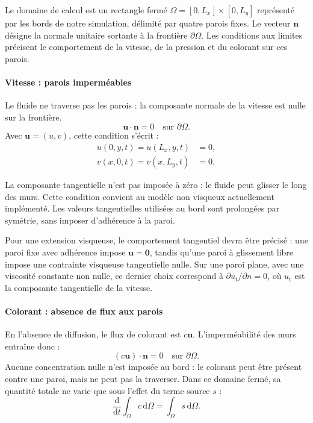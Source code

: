 \label{sec:boundary_conditions}

Le domaine de calcul est un rectangle fermé
$\Omega = [0,L_x] \times [0,L_y]$ représenté par les bords de notre simulation, délimité par quatre parois fixes.
Le vecteur $\mathbf{n}$ désigne la normale unitaire sortante à la frontière
$\partial\Omega$.
Les conditions aux limites précisent le comportement de la vitesse,
de la pression et du colorant sur ces parois.

\paragraph*{Vitesse : parois imperméables}

Le fluide ne traverse pas les parois : la composante normale de la vitesse
est nulle sur la frontière.
\begin{equation}
    \label{eq:wall_impermeability}
    \boxed{\mathbf{u} \cdot \mathbf{n} = 0
        \quad \text{sur } \partial\Omega.}
\end{equation}
Avec $\mathbf{u} = (u,v)$, cette condition s'écrit :
\begin{equation}
    \begin{aligned}
        u(0,y,t) = u(L_x,y,t) &= 0, \\
        v(x,0,t) = v(x,L_y,t) &= 0.
    \end{aligned}
\end{equation}

La composante tangentielle n'est pas imposée à zéro : le fluide peut
glisser le long des murs.
Cette condition convient au modèle non visqueux actuellement implémenté.
Les valeurs tangentielles utilisées au bord sont prolongées par symétrie,
sans imposer d'adhérence à la paroi.

Pour une extension visqueuse, le comportement tangentiel devra être
précisé : une paroi fixe avec adhérence impose $\mathbf{u}=\mathbf{0}$,
tandis qu'une paroi à glissement libre impose une contrainte visqueuse
tangentielle nulle.
Sur une paroi plane, avec une viscosité constante non nulle, ce dernier
choix correspond à $\partial u_{\mathrm{t}}/\partial n = 0$,
où $u_{\mathrm{t}}$ est la composante tangentielle de la vitesse.

\paragraph*{Colorant : absence de flux aux parois}

En l'absence de diffusion, le flux de colorant est $c\mathbf{u}$.
L'imperméabilité des murs entraîne donc :
\begin{equation}
    \label{eq:dye_boundary}
    \boxed{(c\mathbf{u})\cdot\mathbf{n} = 0
        \quad \text{sur } \partial\Omega.}
\end{equation}
Aucune concentration nulle n'est imposée au bord : le colorant peut
être présent contre une paroi, mais ne peut pas la traverser.
Dans ce domaine fermé, sa quantité totale ne varie que sous l'effet
du terme source $s$ :
\begin{equation}
    \frac{\mathrm{d}}{\mathrm{d}t}\int_{\Omega} c\,\mathrm{d}\Omega
    = \int_{\Omega} s\,\mathrm{d}\Omega.
\end{equation}

